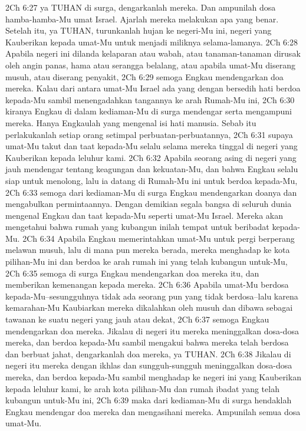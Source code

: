 2Ch 6:27  ya TUHAN di surga, dengarkanlah mereka. Dan ampunilah dosa hamba-hamba-Mu umat Israel. Ajarlah mereka melakukan apa yang benar. Setelah itu, ya TUHAN, turunkanlah hujan ke negeri-Mu ini, negeri yang Kauberikan kepada umat-Mu untuk menjadi miliknya selama-lamanya.
2Ch 6:28  Apabila negeri ini dilanda kelaparan atau wabah, atau tanaman-tanaman dirusak oleh angin panas, hama atau serangga belalang, atau apabila umat-Mu diserang musuh, atau diserang penyakit,
2Ch 6:29  semoga Engkau mendengarkan doa mereka. Kalau dari antara umat-Mu Israel ada yang dengan bersedih hati berdoa kepada-Mu sambil menengadahkan tangannya ke arah Rumah-Mu ini,
2Ch 6:30  kiranya Engkau di dalam kediaman-Mu di surga mendengar serta mengampuni mereka. Hanya Engkaulah yang mengenal isi hati manusia. Sebab itu perlakukanlah setiap orang setimpal perbuatan-perbuatannya,
2Ch 6:31  supaya umat-Mu takut dan taat kepada-Mu selalu selama mereka tinggal di negeri yang Kauberikan kepada leluhur kami.
2Ch 6:32  Apabila seorang asing di negeri yang jauh mendengar tentang keagungan dan kekuatan-Mu, dan bahwa Engkau selalu siap untuk menolong, lalu ia datang di Rumah-Mu ini untuk berdoa kepada-Mu,
2Ch 6:33  semoga dari kediaman-Mu di surga Engkau mendengarkan doanya dan mengabulkan permintaannya. Dengan demikian segala bangsa di seluruh dunia mengenal Engkau dan taat kepada-Mu seperti umat-Mu Israel. Mereka akan mengetahui bahwa rumah yang kubangun inilah tempat untuk beribadat kepada-Mu.
2Ch 6:34  Apabila Engkau memerintahkan umat-Mu untuk pergi berperang melawan musuh, lalu di mana pun mereka berada, mereka menghadap ke kota pilihan-Mu ini dan berdoa ke arah rumah ini yang telah kubangun untuk-Mu,
2Ch 6:35  semoga di surga Engkau mendengarkan doa mereka itu, dan memberikan kemenangan kepada mereka.
2Ch 6:36  Apabila umat-Mu berdosa kepada-Mu--sesungguhnya tidak ada seorang pun yang tidak berdosa--lalu karena kemarahan-Mu Kaubiarkan mereka dikalahkan oleh musuh dan dibawa sebagai tawanan ke suatu negeri yang jauh atau dekat,
2Ch 6:37  semoga Engkau mendengarkan doa mereka. Jikalau di negeri itu mereka meninggalkan dosa-dosa mereka, dan berdoa kepada-Mu sambil mengakui bahwa mereka telah berdosa dan berbuat jahat, dengarkanlah doa mereka, ya TUHAN.
2Ch 6:38  Jikalau di negeri itu mereka dengan ikhlas dan sungguh-sungguh meninggalkan dosa-dosa mereka, dan berdoa kepada-Mu sambil menghadap ke negeri ini yang Kauberikan kepada leluhur kami, ke arah kota pilihan-Mu dan rumah ibadat yang telah kubangun untuk-Mu ini,
2Ch 6:39  maka dari kediaman-Mu di surga hendaklah Engkau mendengar doa mereka dan mengasihani mereka. Ampunilah semua dosa umat-Mu.
